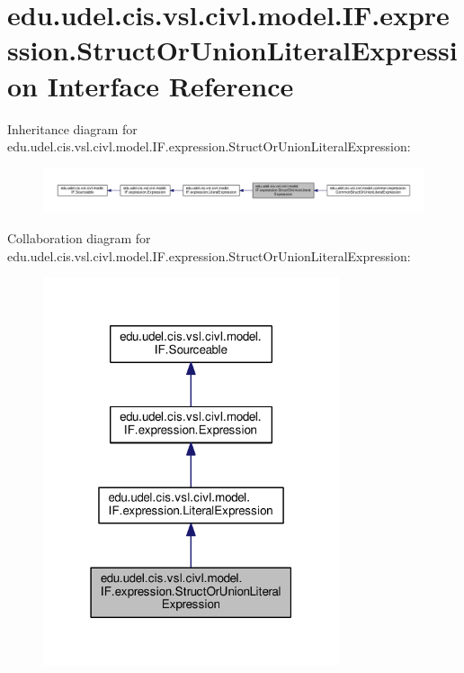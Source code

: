 \hypertarget{interfaceedu_1_1udel_1_1cis_1_1vsl_1_1civl_1_1model_1_1IF_1_1expression_1_1StructOrUnionLiteralExpression}{}\section{edu.\+udel.\+cis.\+vsl.\+civl.\+model.\+I\+F.\+expression.\+Struct\+Or\+Union\+Literal\+Expression Interface Reference}
\label{interfaceedu_1_1udel_1_1cis_1_1vsl_1_1civl_1_1model_1_1IF_1_1expression_1_1StructOrUnionLiteralExpression}


Inheritance diagram for edu.\+udel.\+cis.\+vsl.\+civl.\+model.\+I\+F.\+expression.\+Struct\+Or\+Union\+Literal\+Expression\+:
\nopagebreak
\begin{figure}[H]
\begin{center}
\leavevmode
\includegraphics[width=350pt]{interfaceedu_1_1udel_1_1cis_1_1vsl_1_1civl_1_1model_1_1IF_1_1expression_1_1StructOrUnionLiteralExpression__inherit__graph}
\end{center}
\end{figure}


Collaboration diagram for edu.\+udel.\+cis.\+vsl.\+civl.\+model.\+I\+F.\+expression.\+Struct\+Or\+Union\+Literal\+Expression\+:
\nopagebreak
\begin{figure}[H]
\begin{center}
\leavevmode
\includegraphics[width=247pt]{interfaceedu_1_1udel_1_1cis_1_1vsl_1_1civl_1_1model_1_1IF_1_1expression_1_1StructOrUnionLiteralExpression__coll__graph}
\end{center}
\end{figure}
